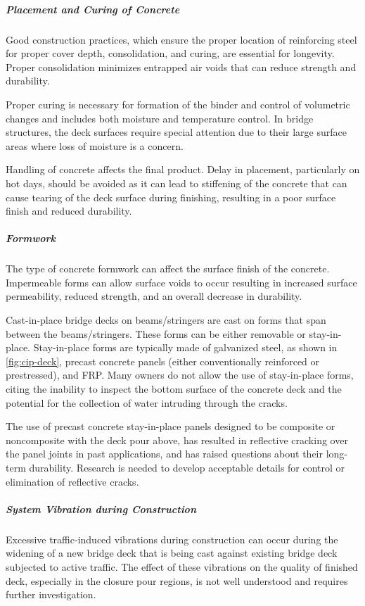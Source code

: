 \subparagraph{Placement and Curing of Concrete}
Good construction practices, which ensure the proper location of reinforcing steel for proper cover depth, consolidation, and curing, are essential for longevity. Proper consolidation minimizes entrapped air voids that can reduce strength and durability.

Proper curing is necessary for formation of the binder and control of volumetric changes and includes both moisture and temperature control. In bridge structures, the deck surfaces require special attention due to their large surface areas where loss of moisture is a concern.

Handling of concrete affects the final product. Delay in placement, particularly on hot days, should be avoided as it can lead to stiffening of the concrete that can cause tearing of the deck surface during finishing, resulting in a poor surface finish and reduced durability.

\subparagraph{Formwork}
The type of concrete formwork can affect the surface finish of the concrete. Impermeable forms can allow surface voids to occur resulting in increased surface permeability, reduced strength, and an overall decrease in durability.

Cast-in-place bridge decks on beams/stringers are cast on forms that span between the beams/stringers. These forms can be either removable or stay-in-place. Stay-in-place forms are typically made of galvanized steel, as shown in \cref{fig:cip-deck}, precast concrete panels (either conventionally reinforced or prestressed), and FRP. Many owners do not allow the use of stay-in-place forms, citing the inability to inspect the bottom surface of the concrete deck and the potential for the collection of water intruding through the cracks.

The use of precast concrete stay-in-place panels designed to be composite or noncomposite with the deck pour above, has resulted in reflective cracking over the panel joints in past applications, and has raised questions about their long-term durability. Research is needed to develop acceptable details for control or elimination of reflective cracks.

\subparagraph{System Vibration during Construction}
Excessive traffic-induced vibrations during construction can occur during the widening of a new bridge deck that is being cast against existing bridge deck subjected to active traffic. The effect of these vibrations on the quality of finished deck, especially in the closure pour regions, is not well understood and requires further investigation.

